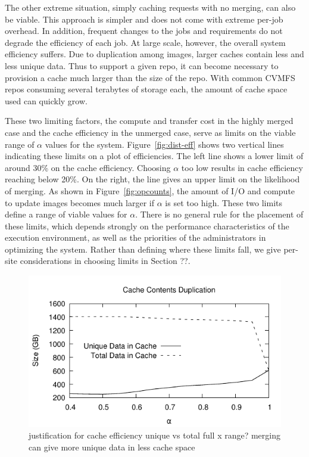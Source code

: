 \documentclass[sigconf]{acmart}
\begin{document}
The other extreme situation,
simply caching requests with no merging,
can also be viable.
This approach is simpler and does not come with extreme per-job overhead.
In addition, frequent changes to the jobs and requirements do not degrade the efficiency of each job.
At large scale, however,
the overall system efficiency suffers.
Due to duplication among images,
larger caches contain less and less unique data.
Thus to support a given repo,
it can become necessary to provision a cache much larger than the size of the repo.
With common CVMFS repos consuming several terabytes of storage each,
the amount of cache space used can quickly grow.

These two limiting factors,
the compute and transfer cost in the highly merged case and the cache efficiency in the unmerged case,
serve as limits on the viable range of $\alpha$ values for the system.
Figure~\ref{fig:dist-eff} shows two vertical lines indicating these limits on a plot of efficiencies.
The left line shows a lower limit of around 30\% on the cache efficiency.
Choosing $\alpha$ too low results in cache efficiency reaching below 20\%.
On the right, the line gives an upper limit on the likelihood of merging.
As shown in Figure~\ref{fig:opcounts},
the amount of I/O and compute to update images becomes much larger if $\alpha$ is set too high.
These two limits define a range of viable values for $\alpha$.
There is no general rule for the placement of these limits,
which depends strongly on the performance characteristics of the execution environment,
as well as the priorities of the administrators in optimizing the system.
Rather than defining where these limits fall,
we give per-site considerations in choosing limits in Section ??.

\begin{figure}
\includegraphics[width=\linewidth]{curated/comparative/cache_efficiency.pdf}
\label{fig:cache-eff}
justification for cache efficiency
unique vs total
full x range?
merging can give more unique data in less cache space
\end{figure}
\end{document}
